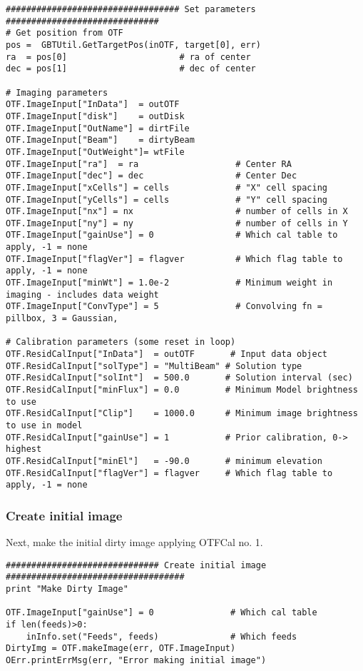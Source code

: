 \documentclass[11pt]{report}
\begin{document}
\begin{verbatim}
################################## Set parameters ##############################
# Get position from OTF
pos =  GBTUtil.GetTargetPos(inOTF, target[0], err)
ra  = pos[0]                      # ra of center
dec = pos[1]                      # dec of center

# Imaging parameters
OTF.ImageInput["InData"]  = outOTF
OTF.ImageInput["disk"]    = outDisk
OTF.ImageInput["OutName"] = dirtFile
OTF.ImageInput["Beam"]    = dirtyBeam
OTF.ImageInput["OutWeight"]= wtFile
OTF.ImageInput["ra"]  = ra                   # Center RA
OTF.ImageInput["dec"] = dec                  # Center Dec
OTF.ImageInput["xCells"] = cells             # "X" cell spacing
OTF.ImageInput["yCells"] = cells             # "Y" cell spacing
OTF.ImageInput["nx"] = nx                    # number of cells in X
OTF.ImageInput["ny"] = ny                    # number of cells in Y
OTF.ImageInput["gainUse"] = 0                # Which cal table to apply, -1 = none
OTF.ImageInput["flagVer"] = flagver          # Which flag table to apply, -1 = none
OTF.ImageInput["minWt"] = 1.0e-2             # Minimum weight in imaging - includes data weight
OTF.ImageInput["ConvType"] = 5               # Convolving fn = pillbox, 3 = Gaussian,

# Calibration parameters (some reset in loop)
OTF.ResidCalInput["InData"]  = outOTF       # Input data object
OTF.ResidCalInput["solType"] = "MultiBeam" # Solution type
OTF.ResidCalInput["solInt"]  = 500.0       # Solution interval (sec)
OTF.ResidCalInput["minFlux"] = 0.0         # Minimum Model brightness to use
OTF.ResidCalInput["Clip"]    = 1000.0      # Minimum image brightness to use in model
OTF.ResidCalInput["gainUse"] = 1           # Prior calibration, 0-> highest
OTF.ResidCalInput["minEl"]   = -90.0       # minimum elevation
OTF.ResidCalInput["flagVer"] = flagver     # Which flag table to apply, -1 = none

\end{verbatim}

\subsubsection{Create initial image}
Next, make the initial dirty image applying OTFCal no. 1.
\begin{verbatim}
############################## Create initial image ###################################
print "Make Dirty Image"

OTF.ImageInput["gainUse"] = 0               # Which cal table
if len(feeds)>0:
    inInfo.set("Feeds", feeds)              # Which feeds
DirtyImg = OTF.makeImage(err, OTF.ImageInput)
OErr.printErrMsg(err, "Error making initial image")

\end{verbatim}
\end{document}
